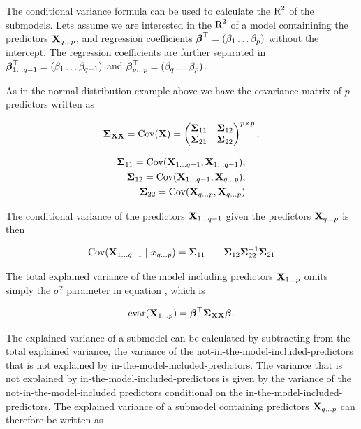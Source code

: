 \documentclass[11pt,a4paper,twoside]{book}\usepackage[]{graphicx}\usepackage[]{color}
\begin{document}
The conditional variance formula can be used to calculate the $\text{R}^2$ of the submodels. Lets assume we are interested in the $\text{R}^2$ of a model containining the predictors ${\mathbf{X}}_{q...p}$, and regression coefficients ${\boldsymbol{\beta}}^\top = (\beta_{1} \dots \beta_{p})$ without the intercept. The regression coefficients are further separated in ${\boldsymbol{\beta}}^\top_{1 \dots q-1} = (\beta_{1} \dots \beta_{q-1})$ and ${\boldsymbol{\beta}}^\top_{q \dots p} = (\beta_{q} \dots \beta_{p})$. 

As in the normal distribution example above we have the covariance matrix of $p$ predictors written as 

      \begin{align} 
	{\boldsymbol{\Sigma}}{}_{{\mathbf{X}} {\mathbf{X}}} =	\operatorname{Cov}({\mathbf{X}}) = \begin{pmatrix}
{\boldsymbol{\Sigma}}{}_{11} & {\boldsymbol{\Sigma}}{}_{12} \\
{\boldsymbol{\Sigma}}{}_{21} & {\boldsymbol{\Sigma}}{}_{22}  \\
\end{pmatrix}^{p \times p}, 
   \end{align}
   
         \begin{align} 
   {\boldsymbol{\Sigma}}{}_{11} = \operatorname{Cov}({\mathbf{X}}_{1\dots q-1}, {\mathbf{X}}_{1 \dots q-1}), \\ {\boldsymbol{\Sigma}}{}_{12} = \operatorname{Cov}({\mathbf{X}}_{1\dots q-1}, {\mathbf{X}}_{q \dots p}),\\ {\boldsymbol{\Sigma}}{}_{22} = \operatorname{Cov}({\mathbf{X}}_{q \dots p}, {\mathbf{X}}_{q \dots p}) \nonumber
      \end{align}
      
 The conditional variance of the predictors $ {\mathbf{X}}_{1 \dots q-1} $ given the predictors  $ {\mathbf{X}}_{q \dots p} $ is then
 
          \begin{align} 
 \cov(\X_{1\dots q-1} \mid \x_{q \dots p}) = \bSigma_{11}\ -\ \bSigma_{12} \bSigma_{22}^{-1}\bSigma_{21}
       \end{align}
       
       The total explained variance of the model including predictors ${\mathbf{X}}_{1 \dots p}$ omits simply the $\sigma^2$ parameter in equation , which is

      \begin{align} 
        \text{evar}({\mathbf{X}}_{1 \dots p}) = {\boldsymbol{\beta}}^\top {\boldsymbol{\Sigma}}{}_{{\mathbf{X}} {\mathbf{X}}}  {\boldsymbol{\beta}}. 
   \end{align}

The explained variance of a submodel can be calculated by subtracting from the total explained variance, the variance of the not-in-the-model-included-predictors that is not explained by in-the-model-included-predictors. The variance that is not explained by in-the-model-included-predictors is given by the variance of the not-in-the-model-included predictors conditional on the in-the-model-included-predictors. The explained variance of a submodel containing predictors ${\mathbf{X}}_{q \dots p}$ can therefore be written as
\end{document}
